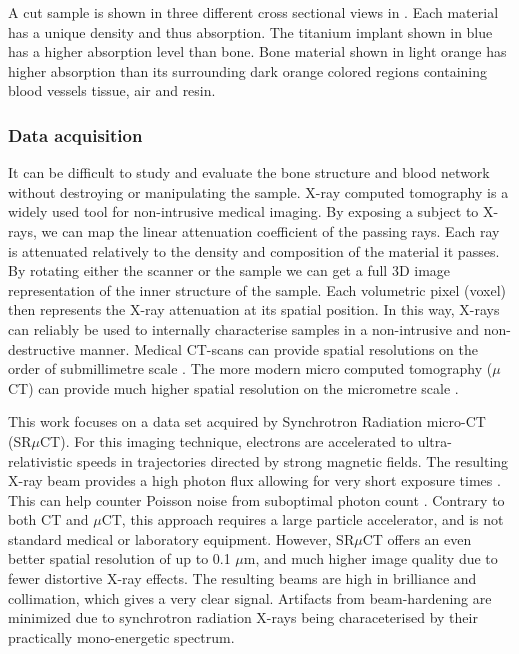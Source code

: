 A cut sample is shown in three different cross sectional views in . Each
material has a unique density and thus absorption. The titanium implant shown in blue has a higher
absorption level than bone. Bone material shown in light orange has higher absorption than its
surrounding dark orange colored regions containing blood vessels tissue, air and resin.

\subsubsection{Data acquisition}

It can be difficult to study and evaluate the bone structure and blood network without destroying or
manipulating the sample. X-ray computed tomography is a widely used tool for non-intrusive medical
imaging. By exposing a subject to X-rays, we can map the linear attenuation coefficient of the
passing rays. Each ray is attenuated relatively to the density and composition of the material it
passes.  By rotating either the scanner or the sample we can get a full 3D image representation of
the inner structure of the sample. Each volumetric pixel (voxel) then represents the X-ray
attenuation at its spatial position. In this way, X-rays can reliably be used to internally characterise
samples in a non-intrusive and non-destructive manner. Medical CT-scans can provide spatial
resolutions on the order of submillimetre scale \citep{medicalct}. The more modern micro computed
tomography ($\mu$CT) can provide much higher spatial resolution on the micrometre scale
\citep{srexptime}.

This work focuses on a data set acquired by Synchrotron Radiation micro-CT (SR$\mu$CT). For this
imaging technique, electrons are accelerated to ultra-relativistic speeds in trajectories directed
by strong magnetic fields. The resulting X-ray beam provides a high photon flux allowing for very
short exposure times \citep{srexptime}. This can help counter Poisson noise from suboptimal photon
count \citep{srnoise}. Contrary to both CT and $\mu$CT, this approach requires a large particle
accelerator, and is not standard medical or laboratory equipment. However, SR$\mu$CT  offers an even
better spatial resolution of up to 0.1 $\mu$m, and much higher image quality due to fewer distortive
X-ray effects. The resulting beams are high in brilliance and collimation, which gives a very clear
signal. Artifacts from beam-hardening are minimized due to synchrotron radiation X-rays being
characeterised by their practically mono-energetic spectrum.

